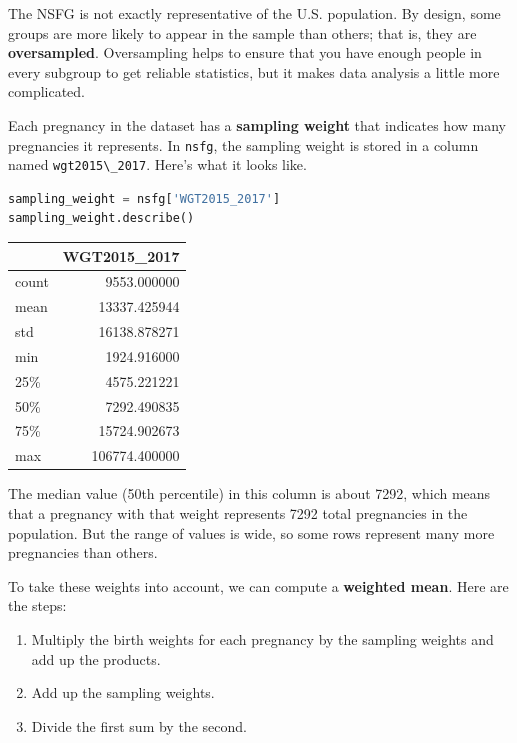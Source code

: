 The NSFG is not exactly representative of the U.S. population. By
design, some groups are more likely to appear in the sample than others;
that is, they are \textbf{oversampled}. Oversampling helps to ensure
that you have enough people in every subgroup to get reliable
statistics, but it makes data analysis a little more complicated.

Each pregnancy in the dataset has a \textbf{sampling weight} that
indicates how many pregnancies it represents. In
\passthrough{\lstinline!nsfg!}, the sampling weight is stored in a
column named \passthrough{\lstinline!wgt2015\_2017!}. Here's what it
looks like.

\begin{lstlisting}[language=Python,style=source]
sampling_weight = nsfg['WGT2015_2017']
sampling_weight.describe()
\end{lstlisting}

\begin{tabular}{lr}
\toprule
{} &   WGT2015\_2017 \\
\midrule
count &    9553.000000 \\
mean  &   13337.425944 \\
std   &   16138.878271 \\
min   &    1924.916000 \\
25\%   &    4575.221221 \\
50\%   &    7292.490835 \\
75\%   &   15724.902673 \\
max   &  106774.400000 \\
\bottomrule
\end{tabular}

The median value (50th percentile) in this column is about 7292, which
means that a pregnancy with that weight represents 7292 total
pregnancies in the population. But the range of values is wide, so some
rows represent many more pregnancies than others.

To take these weights into account, we can compute a \textbf{weighted
mean}. Here are the steps:

\begin{enumerate}
\def\labelenumi{\arabic{enumi}.}
\item
  Multiply the birth weights for each pregnancy by the sampling weights
  and add up the products.
\item
  Add up the sampling weights.
\item
  Divide the first sum by the second.
\end{enumerate}

